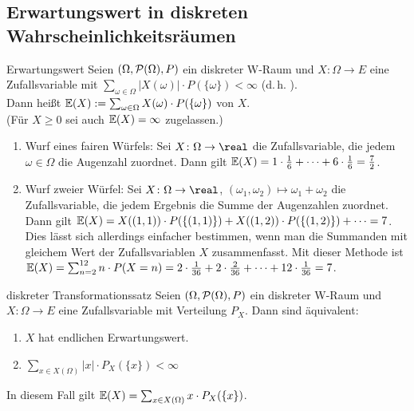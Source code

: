 \pagebreak

\subsection{%
    Erwartungswert in diskreten Wahrscheinlichkeitsräumen%
}

\begin{Def}{Erwartungswert}
    Seien $(\Omega, \P(\Omega), P)$ ein diskreter W-Raum und
    $X\colon \Omega \rightarrow E$ eine Zufallsvariable mit
    $\sum_{\omega \in \Omega} |X(\omega)| \cdot P(\{\omega\}) < \infty$
    (d.\,h. ).\\
    Dann heißt $\EW(X) := \sum_{\omega \in \Omega} X(\omega) \cdot P(\{\omega\})$
     von $X$.\\
    (Für $X \ge 0$ sei auch $\EW(X) = \infty$ zugelassen.)
\end{Def}

\begin{Bsp}
    \begin{enumerate}
        \item
        Wurf eines fairen Würfels:
        Sei $X\colon \Omega \rightarrow \real$ die Zufallsvariable, die jedem $\omega \in \Omega$
        die Augenzahl zuordnet.
        Dann gilt $\EW(X) = 1 \cdot \frac{1}{6} + \dotsb + 6 \cdot \frac{1}{6} = \frac{7}{2}$.

        \item
        Wurf zweier Würfel:
        Sei $X\colon \Omega \rightarrow \real$,
        $(\omega_1, \omega_2) \mapsto \omega_1 + \omega_2$ die Zufallsvariable, die jedem Ergebnis
        die Summe der Augenzahlen zuordnet.\\
        Dann gilt $\EW(X) = X((1, 1)) \cdot P(\{(1, 1)\}) +
        X((1, 2)) \cdot P(\{(1, 2)\}) + \dotsb = 7$.\\
        Dies lässt sich allerdings einfacher bestimmen, wenn man die Summanden mit gleichem
        Wert der Zufallsvariablen $X$ zusammenfasst.
        Mit dieser Methode ist\\
        $\EW(X) = \sum_{n=2}^{12} n \cdot P(X = n) =
        2 \cdot \frac{1}{36} + 2 \cdot \frac{2}{36} + \dotsb + 12 \cdot \frac{1}{36} = 7$.
    \end{enumerate}
\end{Bsp}

\begin{Satz}{diskreter Transformationssatz}
    Seien $(\Omega, \P(\Omega), P)$ ein diskreter W-Raum und
    $X\colon \Omega \rightarrow E$ eine Zufallsvariable mit Verteilung $P_X$.
    Dann sind äquivalent:
    \begin{enumerate}
        \item
        $X$ hat endlichen Erwartungswert.

        \item
        $\sum_{x \in X(\Omega)} |x| \cdot P_X(\{x\}) < \infty$
    \end{enumerate}
    In diesem Fall gilt $\EW(X) = \sum_{x \in X(\Omega)} x \cdot P_X(\{x\})$.
\end{Satz}

